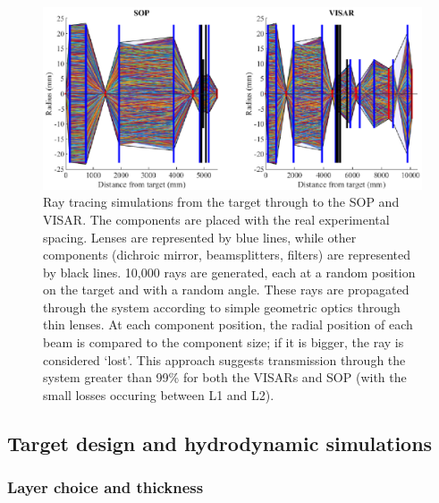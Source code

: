 \begin{figure}
\includegraphics[width=1.0\textwidth]{figures/Experiment/RayTracing.eps}%
\caption{\label{fig:Ray trace} Ray tracing simulations from the target through to the SOP and VISAR. The components are placed with the real experimental spacing. Lenses are represented by blue lines, while other components (dichroic mirror, beamsplitters, filters) are represented by black lines. 10,000 rays are generated, each at a random position on the target and with a random angle. These rays are propagated through the system according to simple geometric optics through thin lenses. At each component position, the radial position of each beam is compared to the component size; if it is bigger, the ray is considered `lost'. This approach suggests transmission through the system greater than 99\% for both the VISARs and SOP (with the small losses occuring between L1 and L2).}
\end{figure}

\subsection{Target design and hydrodynamic simulations} \label{Target Design}

\subsubsection{Layer choice and thickness}

